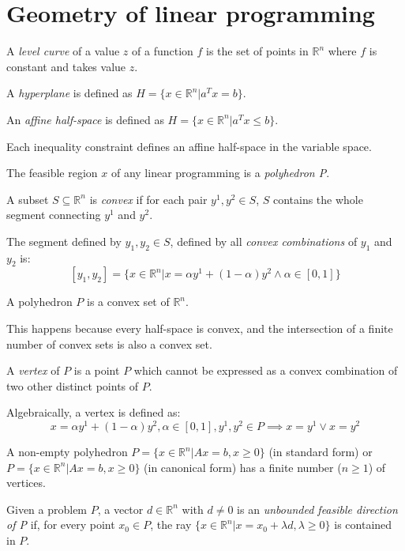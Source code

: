 \documentclass[12pt, a4paper]{report}
\begin{document}
    \section{Geometry of linear programming}
    \begin{definition}
        A \emph{level curve} of a value $z$ of a function $f$ is the set of points in $\mathbb{R}^n$ where $f$ is constant and takes value $z$.
    
        A \emph{hyperplane} is defined as $H=\{x \in \mathbb{R}^n|a^Tx=b\}$. 
    
        An \emph{affine half-space} is defined as $H=\{x \in \mathbb{R}^n|a^Tx \leq b\}$. 
    \end{definition}
    Each inequality constraint defines an affine half-space in the variable space. 
    \begin{definition}
        The feasible region $x$ of any linear programming is a \emph{polyhedron P}.
    
        A subset $S \subseteq \mathbb{R}^n$ is \emph{convex} if for each pair $y^1,y^2 \in S$, $S$ contains the whole segment connecting $y^1$ 
        and $y^2$. 
    
        The segment defined by $y_1,y_2 \in S$, defined by all \emph{convex combinations} of $y_1$ and $y_2$ is: 
        \[[y_1,y_2]=\{x \in \mathbb{R}^n|x=\alpha y^1+(1-\alpha)y^2 \land \alpha \in [0,1]\} \]
    \end{definition}
    \begin{property}
        A polyhedron $P$ is a convex set of $\mathbb{R}^n$. 
    \end{property}
    This happens because every half-space is convex, and the intersection of a finite number of convex sets is also a convex set. 
    \begin{definition}
        A \emph{vertex} of $P$ is a point $P$ which cannot be expressed as a convex combination of two other distinct points of $P$. 
    \end{definition}
    Algebraically, a vertex is defined as: 
    \[x= \alpha y^1+(1-\alpha)y^2, \alpha \in [0,1], y^1,y^2 \in P \implies x=y^1 \lor x=y^2\]
    \begin{property}
        A non-empty polyhedron $P=\{x \in \mathbb{R}^n|Ax=b,x \geq 0\}$ (in standard form)
        or $P=\{x \in \mathbb{R}^n|Ax=b,x \geq 0\}$ (in canonical form) has a 
        finite number ($n \geq 1$) of vertices. 
    \end{property}
    \begin{definition}
        Given a problem $P$, a vector $d \in \mathbb{R}^n$ with $d \neq 0$ is an 
        \emph{unbounded feasible direction of P} if, for every point $x_0 \in P$, the ray $\{x \in \mathbb{R}^n|x=x_0+\lambda d,\lambda \geq 0\}$ is contained in $P$.
    \end{definition}
\end{document}
